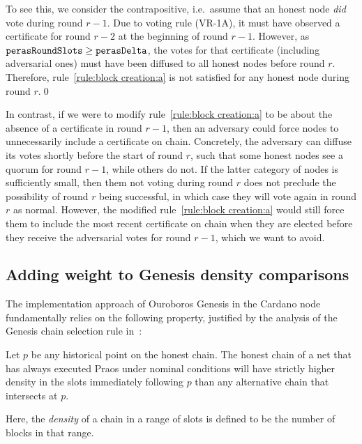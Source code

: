 To see this, we consider the contrapositive, i.e.\ assume that an honest node \emph{did} vote during round $r-1$.
Due to voting rule (VR-1A), it must have observed a certificate for round $r-2$ at the beginning of round $r-1$.
However, as $\mathtt{perasRoundSlots}\ge\mathtt{perasDelta}$, the votes for that certificate (including adversarial ones) must have been diffused to all honest nodes before round $r$.
Therefore, rule~\ref{rule:block creation:a} is not satisfied for any honest node during round $r$.\qed{}

In contrast, if we were to modify rule~\ref{rule:block creation:a} to be about the absence of a certificate in round $r-1$, then an adversary could force nodes to unnecessarily include a certificate on chain.
Concretely, the adversary can diffuse its votes shortly before the start of round $r$, such that some honest nodes see a quorum for round $r-1$, while others do not.
If the latter category of nodes is sufficiently small, then them not voting during round $r$ does not preclude the possibility of round $r$ being successful, in which case they will vote again in round $r$ as normal.
However, the modified rule~\ref{rule:block creation:a} would still force them to include the most recent certificate on chain when they are elected before they receive the adversarial votes for round $r-1$, which we want to avoid.

\subsection{Adding weight to Genesis density comparisons}\label{sec:weighted genesis}

The implementation approach of Ouroboros Genesis in the Cardano node fundamentally relies on the following property, justified by the analysis of the Genesis chain selection rule in~\cite{badertscher2018ouroboros}:
\begin{tcolorbox}[title=\densityOfCompetingChainsName]\label{property:density-of-competing-chains}
  Let $p$ be any historical point on the honest chain. The honest chain of a net that has always executed Praos under nominal conditions will have strictly higher density in the \sgen{} slots immediately following $p$ than any alternative chain that intersects at $p$.
\end{tcolorbox}
Here, the \emph{density} of a chain in a range of slots is defined to be the number of blocks in that range.


